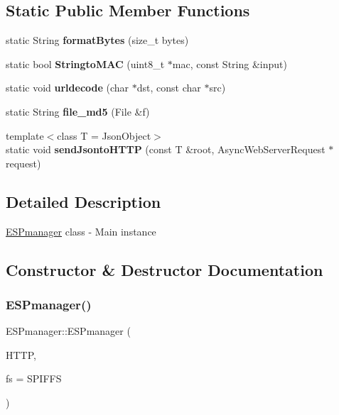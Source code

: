 \subsection*{Static Public Member Functions}
\begin{DoxyCompactItemize}
\item 
\mbox{\label{class_e_s_pmanager_acb4e20b06625138b15c0f39c3522d9ea}} 
static String {\bfseries format\+Bytes} (size\+\_\+t bytes)
\item 
\mbox{\label{class_e_s_pmanager_a73dc4833b3cd7bfbc6dfb81bee54ab36}} 
static bool {\bfseries Stringto\+M\+AC} (uint8\+\_\+t $\ast$mac, const String \&input)
\item 
\mbox{\label{class_e_s_pmanager_a354a5ab6a0c064c75809ce481bc0ba91}} 
static void {\bfseries urldecode} (char $\ast$dst, const char $\ast$src)
\item 
\mbox{\label{class_e_s_pmanager_a6cfff38606f5ed12b49aada480b23cab}} 
static String {\bfseries file\+\_\+md5} (File \&f)
\item 
\mbox{\label{class_e_s_pmanager_ade55619386f08492b0b6d4dbd2cf32c3}} 
{\footnotesize template$<$class T  = Json\+Object$>$ }\\static void {\bfseries send\+Jsonto\+H\+T\+TP} (const T \&root, Async\+Web\+Server\+Request $\ast$request)
\end{DoxyCompactItemize}


\subsection{Detailed Description}
\hyperlink{class_e_s_pmanager}{E\+S\+Pmanager} class -\/ Main instance 

\subsection{Constructor \& Destructor Documentation}
\mbox{\label{class_e_s_pmanager_ade34dcdb30c7577b56f46b03c38b83d8}} 
\subsubsection{\texorpdfstring{E\+S\+Pmanager()}{ESPmanager()}}
{\footnotesize\ttfamily E\+S\+Pmanager\+::\+E\+S\+Pmanager (\begin{DoxyParamCaption}\item[{Async\+Web\+Server \&}]{H\+T\+TP,  }\item[{FS \&}]{fs = {\ttfamily SPIFFS} }\end{DoxyParamCaption})}



